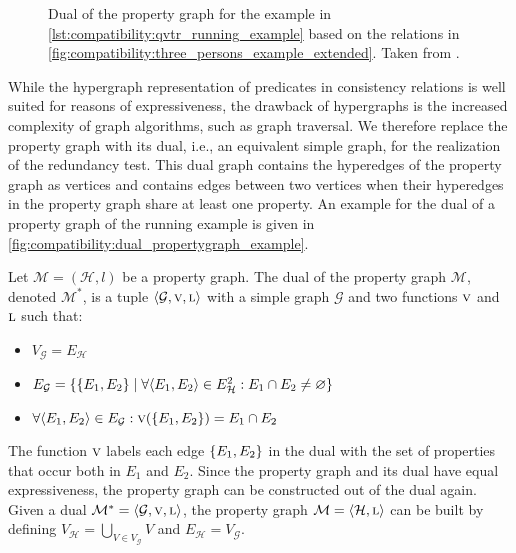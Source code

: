 \begin{figure}
    \centering
    
    
    \caption[Dual of the property graph for the running example]{Dual of the property graph for the \qvtr example in \autoref{lst:compatibility:qvtr_running_example} based on the relations in \autoref{fig:compatibility:three_persons_example_extended}. Taken from .}
    \label{fig:compatibility:dual_propertygraph_example}
\end{figure}

While the hypergraph representation of predicates in consistency relations is well suited for reasons of expressiveness, the drawback of hypergraphs is the increased complexity of graph algorithms, such as graph traversal.
We therefore replace the property graph with its dual, i.e., an equivalent simple graph, for the realization of the redundancy test.
This dual graph contains the hyperedges of the property graph as vertices and contains edges between two vertices when their hyperedges in the property graph share at least one property.
An example for the dual of a property graph of the running example is given in \autoref{fig:compatibility:dual_propertygraph_example}.


\begin{definition}
Let $\mathcal{M} = (\mathcal{H}, l)$ be a property graph. The dual of the property graph $\mathcal{M}$, denoted $\mathcal{M^{*}}$, is a tuple $\langle \mathcal{G}, \textsc{v}, \textsc{l} \rangle$ with a simple graph $\mathcal{G}$ and two functions $\textsc{v}$ and $\textsc{l}$ such that:
    \begin{itemize}
        \item $V_{\mathcal{G}} = E_{\mathcal{H}}$
        \item $E_{\mathcal{G}} = \setted{\setted{E_1, E_2} \mid \forall \tupled{E_1, E_2} \in E_{\mathcal{H}}^2 : E_1 \cap E_2 \neq \varnothing}$
        \item $\forall \tupled{E_1, E_2} \in E_{\mathcal{G}} : \function{v}(\setted{E_1, E_2}) = E_1 \cap E_2$
    \end{itemize}
\end{definition}

The function $\textsc{v}$ labels each edge $\{ E_1, E_2 \}$ in the dual with the set of properties that occur both in $E_1$ and $E_2$.
Since the property graph and its dual have equal expressiveness, the property graph can be constructed out of the dual again.
Given a dual $\mathcal{M^{*}} = \langle \mathcal{G}, \textsc{v}, \textsc{l} \rangle$, the property graph $\mathcal{M} = \langle \mathcal{H}, \textsc{l} \rangle$ can be built by defining $V_{\mathcal{H}} = \bigcup_{V \in V_{\mathcal{G}}} V$ and $E_{\mathcal{H}} = V_{\mathcal{G}}$. 

